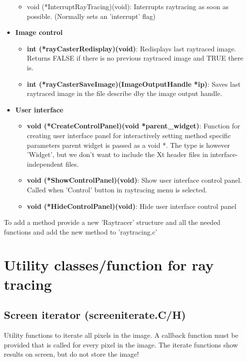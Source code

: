 \documentclass[11pt]{report}
\begin{document}
\begin{itemize}
\begin{itemize}
\item {void (*InterruptRayTracing)(void)}: Interrupts raytracing as soon as
	possible. (Normally sets an 'interrupt' flag)
\end{itemize}

\item{\bf Image control}
\begin{itemize}

\item {\bf int (*rayCasterRedisplay)(void)}: Redisplays last raytraced image.
	Returns FALSE if there is no previous raytraced image and TRUE
	there is.


\item {\bf int (*rayCasterSaveImage)(ImageOutputHandle *ip)}: Saves last raytraced
	image in the file describe dby the image output handle.
\end{itemize}

\item{\bf User interface}
\begin{itemize}

\item {\bf void (*CreateControlPanel)(void *parent\_widget)}: Function for 
	creating user interface panel for interactively setting method
	specific parameters parent widget is passed as a void *. The
	type is however 'Widget', but we don't want to include the Xt
	header files in interface-independent files.

\item {\bf void (*ShowControlPanel)(void)}: Show user interface control panel.
	Called when 'Control' button in raytracing menu is selected.
\item {\bf void (*HideControlPanel)(void)}: Hide user interface control panel
\end{itemize}
\end{itemize}

To add a method provide a new 'Raytracer' structure and
all the needed functions and add the new method to 'raytracing.c'


\section{Utility classes/function for ray tracing}

\subsection{Screen iterator (screeniterate.C/H)}

Utility functions to iterate all pixels in the image.
A callback function must be provided that is called
for every pixel in the image.
The iterate functions show results on screen, but do not
store the image!
\end{document}
